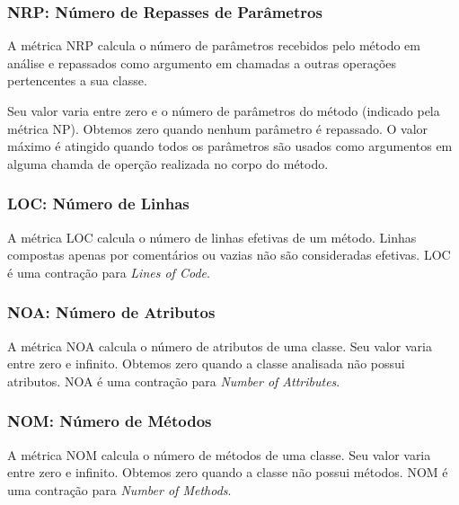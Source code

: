                                                              

\subsubsection{NRP: Número de Repasses de Parâmetros}

	A métrica NRP calcula o número de parâmetros recebidos pelo método em análise e repassados como argumento em chamadas a outras operações pertencentes a sua classe.                                                    
	
	Seu valor varia entre zero e o número de parâmetros do método (indicado pela métrica NP). Obtemos zero quando nenhum parâmetro é repassado. O valor máximo é atingido quando todos os parâmetros são usados como argumentos em alguma chamda de operção realizada no corpo do método. 
                                                      
                                                             

\subsubsection{LOC: Número de Linhas}

	A métrica LOC \citep{LK94} calcula o número de linhas efetivas de um método. Linhas compostas apenas por comentários ou vazias não são consideradas efetivas. LOC é uma contração para \textit{Lines of Code}.



\subsubsection{NOA: Número de Atributos}

	A métrica NOA calcula o número de atributos de uma classe. Seu valor varia entre zero e infinito. Obtemos zero quando a classe analisada não possui atributos. NOA é uma contração para \textit{Number of Attributes}.
                          


\subsubsection{NOM: Número de Métodos}

	A métrica NOM calcula o número de métodos de uma classe. Seu valor varia entre zero e infinito. Obtemos zero quando a classe não possui métodos. NOM é uma contração para \textit{Number of Methods}.
                                                            
